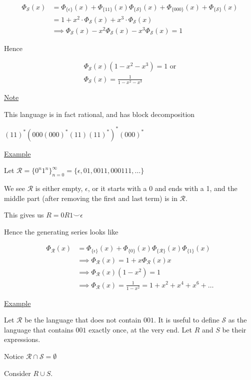 \documentclass{article}
\newcommand\mc{\mathcal}
\begin{document}
\begin{align*}
    \Phi_{\mc{S}}(x) &= \Phi_{\{\epsilon\}}(x) + \Phi_{\{11\}}(x) \Phi_{\{\mc{S}\}}(x) + \Phi_{\{000\}}(x) + \Phi_{\{\mc{S}\}}(x) \\
    &= 1 + x^2 \cdot \Phi_{\mc{S}}(x) + x^3 \cdot \Phi_{\mc{S}}(x) \\
    &\implies \Phi_{\mc{S}}(x) - x^2 \Phi_{\mc{S}}(x) - x^3\Phi_{\mc{S}}(x) = 1
\end{align*}

Hence

\begin{align*}
    \Phi_{\mc{S}}(x)(1-x^2-x^3) = 1 \text{ or} \\
    \Phi_{\mc{S}}(x) = \frac{1}{1-x^2-x^3}
\end{align*}

\underline{Note}

This language is in fact rational, and has block decomposition

$(11)^*(000(000)^*(11)(11)^*)^*(000)^*$

\underline{Example}

Let $\mc{R} = \{0^n1^n\}_{n=0}^{\infty} = \{\epsilon, 01, 0011, 000111,\ldots \}$

We see $\mc{R}$ is either empty, $\epsilon$, or it starts with a 0 and ends with a 1, and the middle part (after removing the first and last term) is in $\mc{R}$.

This gives us $R = 0R1 \smile \epsilon$

Hence the generating series looks like

\begin{align*}
    \Phi_{\mc{R}}(x) &= \Phi_{\{\epsilon\}}(x) + \Phi_{\{0\}}(x) \Phi_{\{\mc{R}\}}(x) \Phi_{\{1\}}(x) \\
    &\implies \Phi_{\mc{R}}(x) = 1 + x \Phi_{\mc{R}}(x)x \\
    &\implies \Phi_{\mc{R}}(x)(1-x^2) = 1 \\
    &\implies \Phi_{\mc{R}}(x) = \frac{1}{1-x^2} = 1 + x^2 + x^4 + x^6 + \ldots
\end{align*}

\underline{Example}

Let $\mc{R}$ be the language that does not contain $001$. It is useful to define $\mc{S}$ as the language that contains $001$ exactly once, at the very end. Let $R$ and $S$ be their expressions.

Notice $\mc{R} \cap \mc{S} = \emptyset$

Consider $R \cup S$. 
\end{document}
